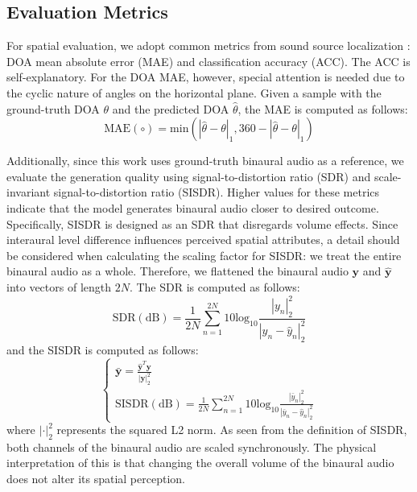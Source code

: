 \documentclass{IEEEtran}
\begin{document}
\subsection{Evaluation Metrics}
For spatial evaluation, we adopt common metrics from sound source localization \cite{feng2025eliminating}: DOA mean absolute error (MAE) and classification accuracy (ACC).
The ACC is self-explanatory. For the DOA MAE, however, special attention is needed due to the cyclic nature of angles on the horizontal plane. Given a sample with the ground-truth DOA \(\theta\) and the predicted DOA \(\hat{\theta}\), the MAE is computed as follows:
\begin{equation}\label{eq:mae}
    \mathrm{MAE}(\circ)= \mathrm{min}(|\hat \theta - \theta|_1, 360-|\hat \theta - \theta|_1)
\end{equation}

Additionally, since this work uses ground-truth binaural audio as a reference, we evaluate the generation quality using signal-to-distortion ratio (SDR) and scale-invariant signal-to-distortion ratio (SISDR). Higher values for these metrics indicate that the model generates binaural audio closer to desired outcome. Specifically, SISDR is designed as an SDR that disregards volume effects. Since interaural level difference influences perceived spatial attributes, a detail should be considered when calculating the scaling factor for SISDR: we treat the entire binaural audio as a whole. Therefore, we flattened the binaural audio \(\mathbf{y}\) and \(\hat{\mathbf{y}}\) into vectors of length \(2N\). The SDR is computed as follows:
\begin{equation}\label{eq:sdr}
    \mathrm{SDR}(\mathrm{dB})= \frac{1}{2N} \sum_{n=1}^{2N}10\mathrm{log}_{10} \frac{|y_n|_2^2}{|y_n - \hat{y}_n|_2^2}
\end{equation}
and the SISDR is computed as follows:
\begin{equation}
    \left\{\begin{array}{l}
    \bar{\mathbf{y}} = \frac{\hat{\mathbf{y}}^T \mathbf{y}}{|\mathbf{y}|_2^2} \\
    \mathrm{SISDR}(\mathrm{dB})= \frac{1}{2N} \sum_{n=1}^{2N}10\mathrm{log}_{10} \frac{|\bar{y}_n|_2^2}{|\bar{y}_n - \hat{y}_n|_2^2}
    \end{array}\right.
\end{equation}
where \( |\cdot|_2^2 \) represents the squared L2 norm. As seen from the definition of SISDR, both channels of the binaural audio are scaled synchronously. The physical interpretation of this is that changing the overall volume of the binaural audio does not alter its spatial perception.
\end{document}
